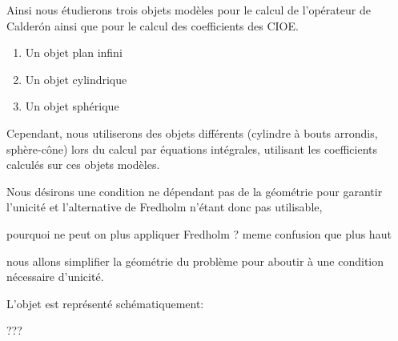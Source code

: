     Ainsi nous étudierons trois objets modèles pour le calcul de l'opérateur de Calderón ainsi que pour le calcul des coefficients des CIOE.
    \begin{enumerate}
      \item Un objet plan infini 
      \item Un objet cylindrique
      \item Un objet sphérique
    \end{enumerate}
   
    Cependant, nous utiliserons des objets différents (cylindre à bouts arrondis, sphère-cône) lors du calcul par équations intégrales, utilisant les coefficients calculés sur ces objets modèles.

    Nous désirons une condition ne dépendant pas de la géométrie pour garantir l'unicité et l'alternative de Fredholm n'étant donc pas utilisable,
    \begin{REM}
  pourquoi ne peut on plus appliquer Fredholm ? meme confusion que plus haut
\end{REM}
    nous allons simplifier la géométrie du problème pour aboutir à une condition nécessaire d'unicité.

    L'objet est représenté schématiquement:
    \begin{REM}
  ???
\end{REM}
    \begin{figure}[h!btp]
        \centering
        \begin{tikzpicture}
            
        \end{tikzpicture}
    \end{figure}

